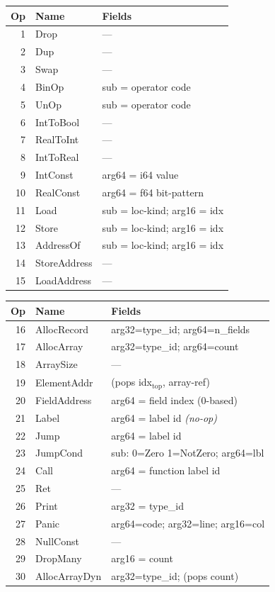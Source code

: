 \documentclass[a4paper]{article}
\begin{document}
\noindent
\begin{minipage}[t]{0.49\textwidth}
{\footnotesize\sffamily
\begin{tabular}{@{}rl p{4.0cm}@{}}
\toprule
\textbf{Op} & \textbf{Name} & \textbf{Fields} \\
\midrule
 1 & Drop          & --- \\
 2 & Dup           & --- \\
 3 & Swap          & --- \\
 4 & BinOp         & sub = operator code \\
 5 & UnOp          & sub = operator code \\
 6 & IntToBool     & --- \\
 7 & RealToInt     & --- \\
 8 & IntToReal     & --- \\
 9 & IntConst      & arg64 = i64 value \\
10 & RealConst     & arg64 = f64 bit-pattern \\
11 & Load          & sub = loc-kind; arg16 = idx \\
12 & Store         & sub = loc-kind; arg16 = idx \\
13 & AddressOf     & sub = loc-kind; arg16 = idx \\
14 & StoreAddress  & --- \\
15 & LoadAddress   & --- \\
\bottomrule
\end{tabular}
}
\end{minipage}
\hfill
\begin{minipage}[t]{0.49\textwidth}
{\footnotesize\sffamily
\begin{tabular}{@{}rl p{4.0cm}@{}}
\toprule
\textbf{Op} & \textbf{Name} & \textbf{Fields} \\
\midrule
16 & AllocRecord   & arg32=type\_id; arg64=n\_fields \\
17 & AllocArray    & arg32=type\_id; arg64=count \\
18 & ArraySize     & --- \\
19 & ElementAddr   & (pops idx$_\text{top}$, array-ref) \\
20 & FieldAddress  & arg64 = field index (0-based) \\
21 & Label         & arg64 = label id \textit{(no-op)} \\
22 & Jump          & arg64 = label id \\
23 & JumpCond      & sub: 0=Zero 1=NotZero; arg64=lbl \\
24 & Call          & arg64 = function label id \\
25 & Ret           & --- \\
26 & Print         & arg32 = type\_id \\
27 & Panic         & arg64=code; arg32=line; arg16=col \\
28 & NullConst     & --- \\
29 & DropMany      & arg16 = count \\
30 & AllocArrayDyn & arg32=type\_id; (pops count) \\
\bottomrule
\end{tabular}
}
\end{minipage}
\end{document}

